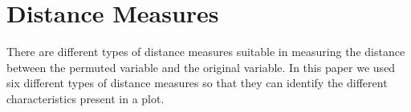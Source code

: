 

\section{Distance Measures}\label{defn.distance}

%
%

%

There are different types of distance measures suitable in measuring the distance between the permuted variable and the original variable. In this paper we used six different types of distance measures so that they can identify the different characteristics present in a plot. \\


